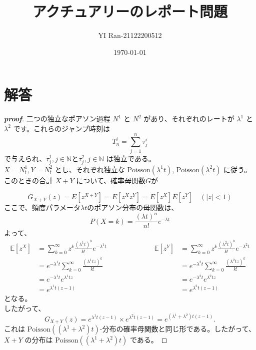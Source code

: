 \documentclass[a4paper]{jsarticle}
\title{\vspace{-4cm}アクチュアリーのレポート問題}
\author{YI Ran-21122200512}
\date{\today}
\begin{document}
\maketitle
\vspace{-0.4cm}
\section*{解答}
\begin{proof}[\textbf{proof}]
  二つの独立なポアソン過程 $N^1$ と $N^2$ があり、それぞれのレートが $\lambda^1$ と $\lambda^2$ です。これらのジャンプ時刻は   
  \[  
  T_n^i = \sum_{j=1}^n \tau_j^i  
  \]  
で与えられ、${\tau_j^1 , j \in \mathbb{N}} と {\tau_j^2 , j \in \mathbb{N}}$ は独立である。\\
$X = N_t^1, Y = N_t^2$ とし、それぞれ独立な $\mathrm{Poisson}(\lambda^1 t)$, $\mathrm{Poisson}(\lambda^2 t)$ に従う。このときの合計 $X+Y$ について、確率母関数$G$が  

  \[  
  G_{X+Y}(z) = E[z^{X+Y}] = E[z^X z^Y] = E[z^X]E[z^Y] \quad (|z| < 1)
  \]  
ここで、頻度パラメータ$\lambda t$のポアソン分布の母関数は、\\  
$$ P(X = k) = \dfrac{(\lambda t)^n}{n!}e^{-\lambda t} $$
よって、\\

\[  
\begin{aligned}  
\mathbb{E}[z^X] &= \sum_{k=0}^{\infty} z^k \frac{(\lambda^1 t)^k}{k!} e^{-\lambda^1 t} \\
                &= e^{-\lambda^1 t}\sum_{k=0}^{\infty}\frac{(\lambda^1 t z)^k}{k!} \\
                &= e^{-\lambda^1 t} e^{\lambda^1 t z}\\
                &= e^{\lambda^1 t(z-1)}  
\end{aligned}  
\hspace{6em}  %
\begin{aligned}  
\mathbb{E}[z^Y] &= \sum_{k=0}^{\infty} z^k \frac{(\lambda^2 t)^k}{k!} e^{-\lambda^2 t} \\
                &= e^{-\lambda^2 t}\sum_{k=0}^{\infty}\frac{(\lambda^2 t z)^k}{k!} \\
                &= e^{-\lambda^2 t} e^{\lambda^2 t z}\\
                &= e^{\lambda^2 t(z-1)}  
\end{aligned}  
\]    
となる。\\
したがって、
\[
  G_{X+Y}(z) = e^{\lambda^1 t(z-1)} \times e^{\lambda^2 t(z-1)} = e^{(\lambda ^1 + \lambda ^2)t(z-1)}.  
\]  
これは $\mathrm{Poisson}((\lambda ^1 + \lambda ^2)t)$-分布の確率母関数と同じ形である。したがって、$X+Y$ の分布は $\mathrm{Poisson}((\lambda ^1 + \lambda ^2)t)$ である。
\end{proof}  
\end{document}
